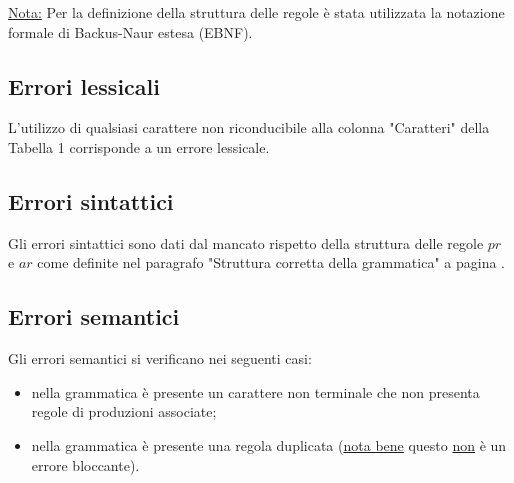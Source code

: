\documentclass[12pt]{article}
\begin{document}
\underline{Nota:} Per la definizione della struttura delle regole è stata utilizzata la notazione formale di Backus-Naur estesa (EBNF).

\subsection{Errori lessicali}
L'utilizzo di qualsiasi carattere non riconducibile alla colonna "Caratteri" della Tabella 1 corrisponde a un errore lessicale.

\subsection{Errori sintattici}
Gli errori sintattici sono dati dal mancato rispetto della struttura delle regole $pr$ e $ar$ come definite nel paragrafo "Struttura corretta della grammatica" a pagina \pageref{struttura}.

\subsection{Errori semantici}
Gli errori semantici si verificano nei seguenti casi:
\begin{itemize}
\item nella grammatica è presente un carattere non terminale che non presenta regole di produzioni associate;
\item nella grammatica è presente una regola duplicata (\underline{nota bene} questo \underline{non} è un errore bloccante).
\end{itemize}
\end{document}
